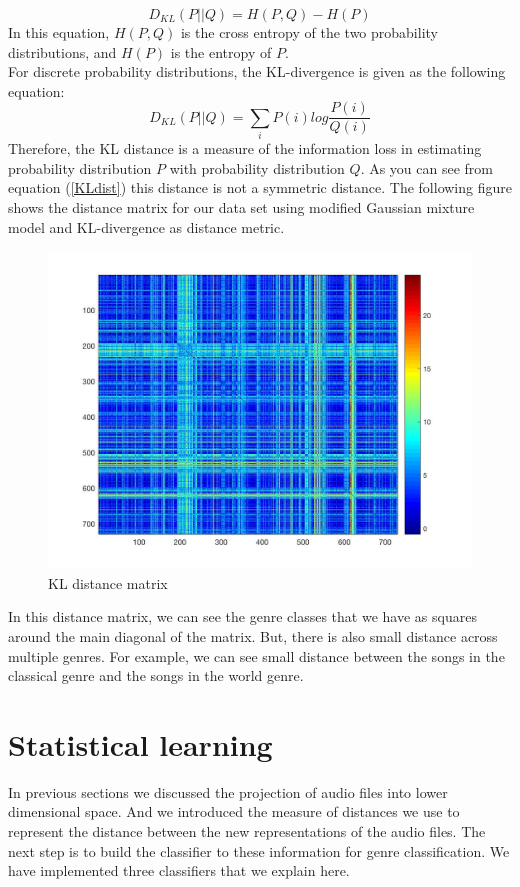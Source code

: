 \documentclass[12pt]{article}
\begin{document}
\begin{equation}\label{KLdist}
D_{KL}(P||Q) = H(P,Q) - H(P)
\end{equation}
In this equation, $H(P,Q)$ is the cross entropy of the two probability distributions, and $H(P)$ is the entropy of $P$. \\
For discrete probability distributions, the KL-divergence is given as the following equation:
\begin{equation}\label{KLdist}
D_{KL}(P||Q) = \sum_i P(i) log \frac{P(i)}{Q(i)}
\end{equation}
Therefore, the KL distance is a measure of the information loss in estimating probability distribution $P$ with probability distribution $Q$. As you can see from equation (\ref{KLdist}) this distance is not a symmetric distance. The following figure shows the distance matrix for our data set using modified Gaussian mixture model and KL-divergence as distance metric.
\begin{figure}[H]\label{KLDiv}
	\centering
	\includegraphics[width=1\linewidth]{KLDiv.jpg}
	\caption{KL distance matrix}
\end{figure}
In this distance matrix, we can see the genre classes that we have as squares around the main diagonal of the matrix. But, there is also small distance across multiple genres. For example, we can see small distance between the songs in the classical genre and the songs in the world genre.
\section{Statistical learning}
In previous sections we discussed the projection of audio files into lower dimensional space. And we introduced the measure of distances we use to represent the distance between the new representations of the audio files. The next step is to build the classifier to these information for genre classification. We have implemented three classifiers that we explain here.
\end{document}
